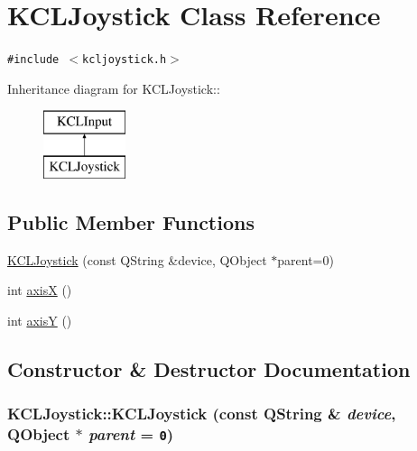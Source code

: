 \hypertarget{class_k_c_l_joystick}{
\section{KCLJoystick Class Reference}
\label{class_k_c_l_joystick}
}
{\tt \#include $<$kcljoystick.h$>$}

Inheritance diagram for KCLJoystick::\begin{figure}[H]
\begin{center}
\leavevmode
\includegraphics[height=2cm]{class_k_c_l_joystick}
\end{center}
\end{figure}
\subsection*{Public Member Functions}
\begin{CompactItemize}
\item 
\hyperlink{class_k_c_l_joystick_9a424984a46254d07b3ab6b6f5946830}{KCLJoystick} (const QString \&device, QObject $\ast$parent=0)
\item 
int \hyperlink{class_k_c_l_joystick_70988b3702bf410f86a66fb1277913fd}{axisX} ()
\item 
int \hyperlink{class_k_c_l_joystick_0055ef283714ae8545021761e2903376}{axisY} ()
\end{CompactItemize}


\subsection{Constructor \& Destructor Documentation}
\hypertarget{class_k_c_l_joystick_9a424984a46254d07b3ab6b6f5946830}{
\subsubsection[{KCLJoystick}]{\setlength{\rightskip}{0pt plus 5cm}KCLJoystick::KCLJoystick (const QString \& {\em device}, \/  QObject $\ast$ {\em parent} = {\tt 0})}}
\label{class_k_c_l_joystick_9a424984a46254d07b3ab6b6f5946830}




